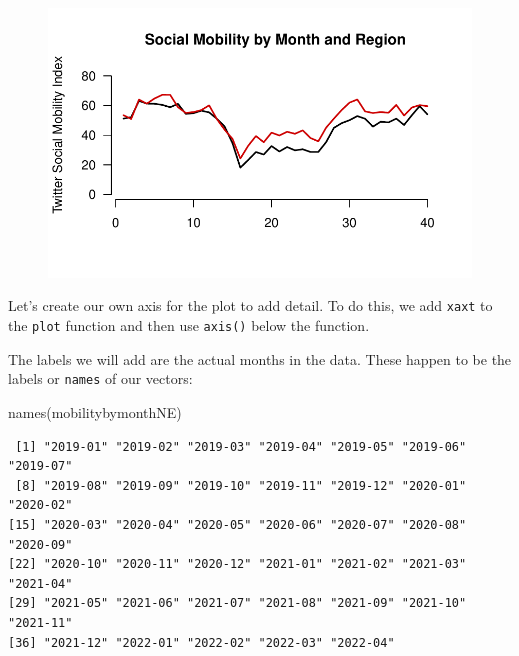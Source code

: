 \documentclass[
  letterpaper,
  DIV=11,
  numbers=noendperiod]{scrreprt}
\newenvironment{Shaded}{\begin{snugshade}}{\end{snugshade}}
\newcommand{\FunctionTok}[1]{\textcolor[rgb]{0.28,0.35,0.67}{#1}}
\newcommand{\NormalTok}[1]{\textcolor[rgb]{0.00,0.23,0.31}{#1}}
\begin{document}
\begin{figure}[H]

{\centering \includegraphics{04-Visualization_files/figure-pdf/unnamed-chunk-40-1.pdf}

}

\end{figure}

Let's create our own axis for the plot to add detail. To do this, we add
\texttt{xaxt} to the \texttt{plot} function and then use \texttt{axis()}
below the function.

The labels we will add are the actual months in the data. These happen
to be the labels or \texttt{names} of our vectors:

\begin{Shaded}
\begin{Highlighting}[]
\FunctionTok{names}\NormalTok{(mobilitybymonthNE)}
\end{Highlighting}
\end{Shaded}

\begin{verbatim}
 [1] "2019-01" "2019-02" "2019-03" "2019-04" "2019-05" "2019-06" "2019-07"
 [8] "2019-08" "2019-09" "2019-10" "2019-11" "2019-12" "2020-01" "2020-02"
[15] "2020-03" "2020-04" "2020-05" "2020-06" "2020-07" "2020-08" "2020-09"
[22] "2020-10" "2020-11" "2020-12" "2021-01" "2021-02" "2021-03" "2021-04"
[29] "2021-05" "2021-06" "2021-07" "2021-08" "2021-09" "2021-10" "2021-11"
[36] "2021-12" "2022-01" "2022-02" "2022-03" "2022-04"
\end{verbatim}
\end{document}
